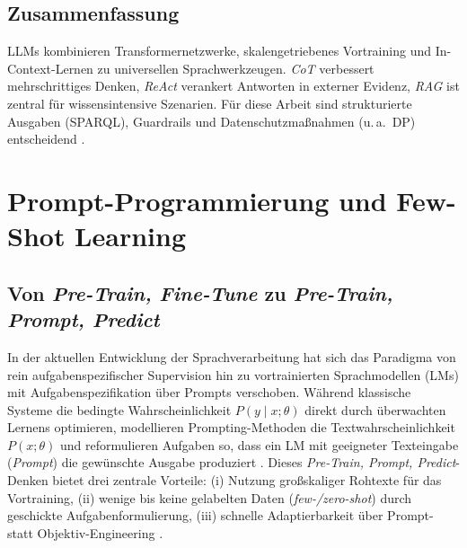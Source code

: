 \subsection{Zusammenfassung}
LLMs kombinieren Transformernetzwerke, skalengetriebenes Vortraining und In-Context-Lernen zu universellen Sprachwerkzeugen. \emph{CoT} verbessert mehrschrittiges Denken, \emph{ReAct} verankert Antworten in externer Evidenz, \emph{RAG} ist zentral für wissensintensive Szenarien. Für diese Arbeit sind strukturierte Ausgaben (SPARQL), Guardrails und Datenschutzmaßnahmen (u.\,a.\ DP) entscheidend \cite{vaswani2017attention,brown2020language,wei2022chain,yao2023react,ouyang2022training,lewis2020rag,holtzman2020curious,abadi2016deep,carlini2021extracting,dubey2019lcquad2,cong2023schema}.









\section{Prompt-Programmierung und Few-Shot Learning}
\label{sec:prompting}

\subsection{Von \emph{Pre-Train, Fine-Tune} zu \emph{Pre-Train, Prompt, Predict}}
In der aktuellen Entwicklung der Sprachverarbeitung hat sich das Paradigma von rein aufgaben\-spezifischer Supervision hin zu vortrainierten Sprachmodellen (LMs) mit Aufgabenspezifikation über Prompts verschoben. Während klassische Systeme die bedingte Wahrscheinlichkeit \(P(y \mid x;\theta)\) direkt durch überwachten Lernens optimieren, modellieren Prompting-Methoden die Textwahrscheinlichkeit \(P(x;\theta)\) und reformulieren Aufgaben so, dass ein LM mit geeigneter Texteingabe (\emph{Prompt}) die gewünschte Ausgabe produziert \cite{liu2023survey}. Dieses \emph{Pre-Train, Prompt, Predict}-Denken bietet drei zentrale Vorteile: (i) Nutzung großskaliger Rohtexte für das Vortraining, (ii) wenige bis keine gelabelten Daten (\emph{few-/zero-shot}) durch geschickte Aufgabenformulierung, (iii) schnelle Adaptierbarkeit über Prompt- statt Objektiv-Engineering \cite{liu2023survey}.

